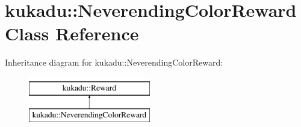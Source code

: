 \hypertarget{classkukadu_1_1NeverendingColorReward}{\section{kukadu\-:\-:Neverending\-Color\-Reward Class Reference}
\label{classkukadu_1_1NeverendingColorReward}
}
Inheritance diagram for kukadu\-:\-:Neverending\-Color\-Reward\-:\begin{figure}[H]
\begin{center}
\leavevmode
\includegraphics[height=2.000000cm]{classkukadu_1_1NeverendingColorReward}
\end{center}
\end{figure}
